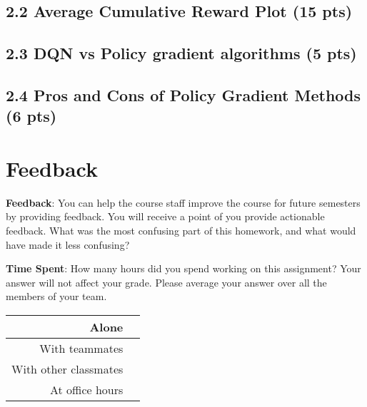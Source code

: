 \documentclass[12pt]{article}
\begin{document}
\subsection*{2.2 Average Cumulative Reward Plot (15 pts)}
\begin{solution}[height=12cm]
\end{solution}



\subsection*{2.3 DQN vs Policy gradient algorithms (5 pts)}
\begin{solution}[height=5cm]
\end{solution}

\subsection*{2.4 Pros and Cons of Policy Gradient Methods (6 pts)}
\begin{solution}[height=5cm]
\end{solution}



\clearpage
\section*{Feedback}

\textbf{Feedback}: You can help the course staff improve the course for future semesters by providing feedback. You will receive a point of you provide actionable feedback. What was the most confusing part of this homework, and what would have made it less confusing?
\begin{solution}[height=4cm]
\end{solution}

\noindent\textbf{Time Spent}: How many hours did you spend working on this assignment? Your answer will not affect your grade. Please average your answer over all the members of your team.
\begin{table}[H]
    \centering
    \begin{tabular}{r|c}
        Alone &  \hspace{3em} %
        \\ \hline
        With teammates & \hspace{3em} %
        \\ \hline
        With other classmates & \hspace{3em} %
        \\ \hline
        At office hours & \hspace{3em} %
        \\ \hline
    \end{tabular}
\end{table}
\end{document}
